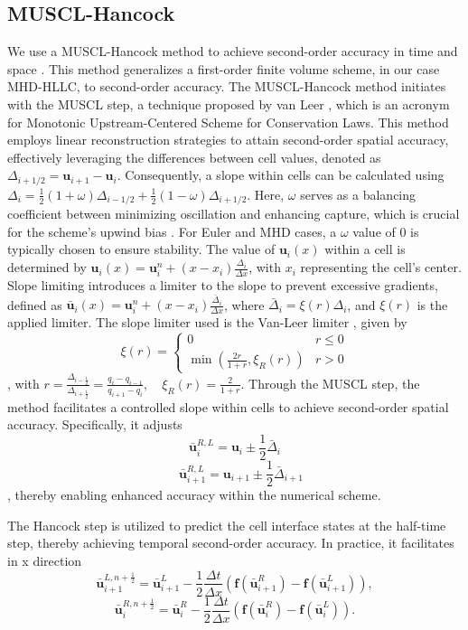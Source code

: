 \subsection{MUSCL-Hancock}
We use a MUSCL-Hancock method to achieve second-order accuracy in time and space \cite{toro2013riemann}. This method generalizes a first-order finite volume scheme, in our case MHD-HLLC, to second-order accuracy. 
The MUSCL-Hancock method initiates with the MUSCL step, a technique proposed by van Leer \cite{van1979towards}, which is an acronym for Monotonic Upstream-Centered Scheme for Conservation Laws. This method employs linear reconstruction strategies to attain second-order spatial accuracy, effectively leveraging the differences between cell values, denoted as $\Delta_{i+1/2}=\mathbf{u}_{i+1}-\mathbf{u}_i$. Consequently, a slope within cells can be calculated using $\Delta_i=\frac{1}{2}(1+\omega)\Delta_{i-1/2}+\frac{1}{2}(1-\omega)\Delta_{i+1/2}$. Here, $\omega$ serves as a balancing coefficient between minimizing oscillation and enhancing capture, which is crucial for the scheme's upwind bias \cite{li2019weno}. For Euler and MHD cases, a $\omega$ value of 0 is typically chosen to ensure stability. The value of $\mathbf{u}_{i}(x)$ within a cell is determined by $\mathbf{u}_{i}(x)=\mathbf{u}_{i}^n+(x-x_i)\frac{\Delta_i}{\Delta x}$, with $x_i$ representing the cell's center. Slope limiting introduces a limiter to the slope to prevent excessive gradients, defined as ${{\mathbf{\bar{u}}}_{i}}(x)=\mathbf{u}_{i}^{n}+(x-{{x}_{i}})\frac{{\bar{\Delta}}_{i}}{\Delta x}$, where ${{\bar{\Delta }}_{i}}=\xi (r){{\Delta }_{i}}$, and $\xi(r)$ is the applied limiter. The slope limiter used is the Van-Leer limiter \cite{van1979towards}, given by $$\xi(r) = 
\begin{cases} 
0 & r \leq 0 \\
\min\left( \frac{2r}{1+r}, \xi_R(r) \right) & r > 0 
\end{cases}$$, with $r = \frac{\Delta_{i-\frac{1}{2}}}{\Delta_{i+\frac{1}{2}}}=\frac{q_i-q_{i-1}}{q_{i+1}-q_i}, \quad \xi_R(r) = \frac{2}{1+r}
$. Through the MUSCL step, the method facilitates a controlled slope within cells to achieve second-order spatial accuracy. Specifically, it adjusts $$\mathbf{\bar{u}}_i^{R,L}=\mathbf{u}_i\pm \frac{1}{2}\bar{\Delta}_i$$ $$\quad \mathbf{\bar{u}}_{i+1}^{R,L}=\mathbf{u}_{i+1}\pm \frac{1}{2}\bar{\Delta}_{i+1}$$, thereby enabling enhanced accuracy within the numerical scheme.

The Hancock step is utilized to predict the cell interface states at the half-time step, thereby achieving temporal second-order accuracy. In practice, it facilitates in x direction $$\mathbf{\bar{u}}^{L,n+\frac{1}{2}}_{i+1} = \mathbf{\bar{u}}^{L}_{i+1} - \frac{1}{2} \frac{\Delta t}{\Delta x} \left( \mathbf{f}(\mathbf{\bar{u}}^{R}_{i+1}) - \mathbf{f}(\mathbf{\bar{u}}^{L}_{i+1}) \right),$$
$$\mathbf{\bar{u}}^{R,n+\frac{1}{2}}_{i} = \mathbf{\bar{u}}^{R}_{i} - \frac{1}{2} \frac{\Delta t}{\Delta x} \left( \mathbf{f}(\mathbf{\bar{u}}^{R}_{i}) - \mathbf{f}(\mathbf{\bar{u}}^{L}_{i}) \right).$$


